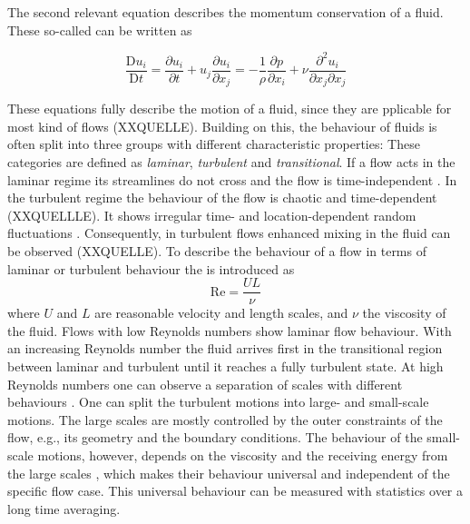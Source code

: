 The second relevant equation describes the momentum conservation of a fluid.
These so-called  can be written as 

\begin{equation}
    \frac{\mathrm{D}u_i}{\mathrm{D}t} = \frac{\partial u_i}{\partial t} + u_j \frac{\partial u_i}{\partial x_j} = -\frac{1}{\rho} \frac{\partial p}{\partial x_i} + \nu \frac{\partial^2 u_i}{\partial x_j \partial x_j}
\end{equation}

These equations fully describe the motion of a fluid, since they are pplicable for most kind of flows (XXQUELLE).
Building on this,  the behaviour of fluids is often split into three groups with different characteristic properties:
These categories are defined as \emph{laminar},  \emph{turbulent} and  \emph{transitional}. 
If a flow acts in the laminar regime its streamlines do not cross and the flow is time-independent \citep{davidson_turbulence_2015}.
In the turbulent regime the behaviour of the flow is chaotic and time-dependent (XXQUELLLE).
It shows irregular time- and location-dependent random fluctuations \citep{pope_turbulent_2015}.
Consequently, in turbulent flows enhanced mixing in the fluid can be observed (XXQUELLE).
To describe the behaviour of a flow in terms of laminar or turbulent behaviour the  is introduced as 
\begin{equation}
    \mathrm{Re} = \frac{U L}{\nu}
\end{equation}
where $U$ and $L$ are reasonable velocity and length scales, and $\nu$ the viscosity of the fluid.
Flows with low Reynolds numbers show laminar flow behaviour.
With an increasing Reynolds number the fluid arrives first in the transitional region between laminar and turbulent until it reaches a fully turbulent state.
At high Reynolds numbers one can observe a separation of scales with different behaviours \citep{pope_turbulent_2015}.
One can split the turbulent motions into large- and small-scale motions.
The large scales are mostly controlled by the outer constraints of the flow, e.g., its geometry and the boundary conditions.
The behaviour of the small-scale motions, however, depends on the viscosity and the receiving energy from the large scales \citep{pope_turbulent_2015}, which makes their behaviour universal and independent of the specific flow case.
This universal behaviour can be measured with statistics over a long time averaging.



